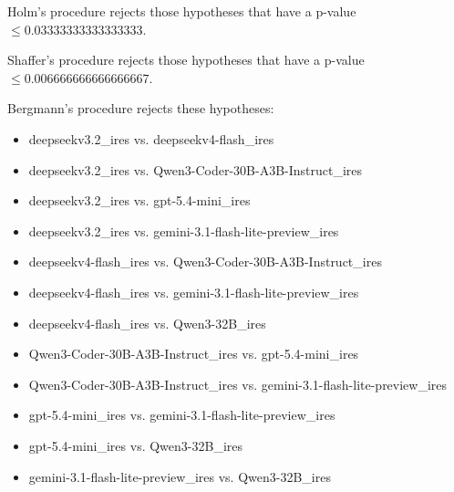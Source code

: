 \documentclass[a4paper,10pt]{article}
\begin{document}
\begin{landscape}
Holm's procedure rejects those hypotheses that have a p-value $\le0.03333333333333333$.


Shaffer's procedure rejects those hypotheses that have a p-value $\le0.006666666666666667$.


Bergmann's procedure rejects these hypotheses:


\begin{itemize}


\item deepseekv3.2_ires vs. deepseekv4-flash_ires
\item deepseekv3.2_ires vs. Qwen3-Coder-30B-A3B-Instruct_ires
\item deepseekv3.2_ires vs. gpt-5.4-mini_ires
\item deepseekv3.2_ires vs. gemini-3.1-flash-lite-preview_ires
\item deepseekv4-flash_ires vs. Qwen3-Coder-30B-A3B-Instruct_ires
\item deepseekv4-flash_ires vs. gemini-3.1-flash-lite-preview_ires
\item deepseekv4-flash_ires vs. Qwen3-32B_ires
\item Qwen3-Coder-30B-A3B-Instruct_ires vs. gpt-5.4-mini_ires
\item Qwen3-Coder-30B-A3B-Instruct_ires vs. gemini-3.1-flash-lite-preview_ires
\item gpt-5.4-mini_ires vs. gemini-3.1-flash-lite-preview_ires
\item gpt-5.4-mini_ires vs. Qwen3-32B_ires
\item gemini-3.1-flash-lite-preview_ires vs. Qwen3-32B_ires
\end{itemize}



\end{landscape}
\end{document}
